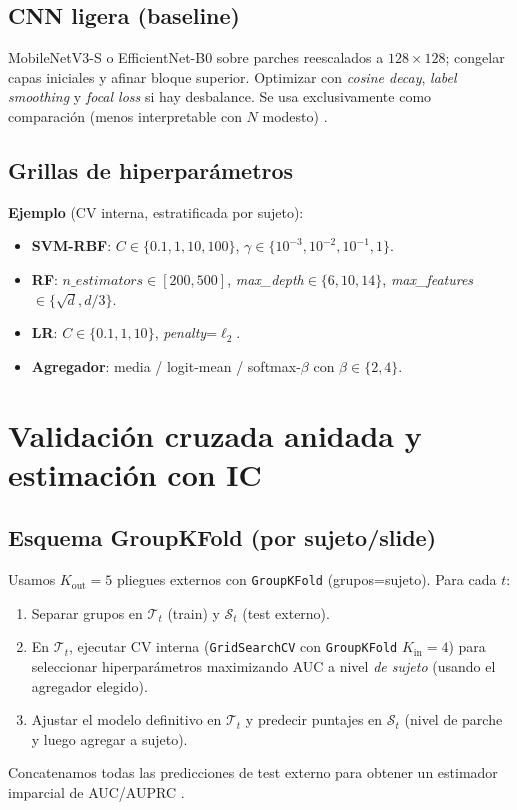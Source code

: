\subsection{CNN ligera (baseline)}
MobileNetV3-S o EfficientNet-B0 sobre parches reescalados a $128\times128$; congelar capas iniciales y afinar bloque superior. Optimizar con \emph{cosine decay}, \emph{label smoothing} y \emph{focal loss} si hay desbalance. Se usa exclusivamente como comparación (menos interpretable con $N$ modesto) \cite{Alzubaidi2020Electronics}.

\subsection{Grillas de hiperparámetros}
\noindent\textbf{Ejemplo} (CV interna, estratificada por sujeto):
\begin{itemize}
\item \textbf{SVM-RBF}: $C\in\{0.1,1,10,100\}$, $\gamma\in\{10^{-3},10^{-2},10^{-1},1\}$.
\item \textbf{RF}: $n\_estimators\in[200,500]$, \emph{max\_depth}$\in\{6,10,14\}$, \emph{max\_features}$\in\{\sqrt{d}, d/3\}$.
\item \textbf{LR}: $C\in\{0.1,1,10\}$, \emph{penalty}=$\ell_2$.
\item \textbf{Agregador}: media / logit-mean / softmax-$\beta$ con $\beta\in\{2,4\}$.
\end{itemize}

\section{Validación cruzada anidada y estimación con IC}
\label{sec:nested_full}

\subsection{Esquema GroupKFold (por sujeto/slide)}
Usamos $K_\text{out}=5$ pliegues externos con \texttt{GroupKFold} (grupos=sujeto). Para cada $t$:
\begin{enumerate}
\item Separar grupos en $\mathcal{T}_t$ (train) y $\mathcal{S}_t$ (test externo).
\item En $\mathcal{T}_t$, ejecutar CV interna (\texttt{GridSearchCV} con \texttt{GroupKFold} $K_\text{in}=4$) para seleccionar hiperparámetros maximizando AUC a nivel \emph{de sujeto} (usando el agregador elegido).
\item Ajustar el modelo definitivo en $\mathcal{T}_t$ y predecir puntajes en $\mathcal{S}_t$ (nivel de parche y luego agregar a sujeto).
\end{enumerate}
Concatenamos todas las predicciones de test externo para obtener un estimador imparcial de AUC/AUPRC \cite{Tsamardinos2022Patterns}.

